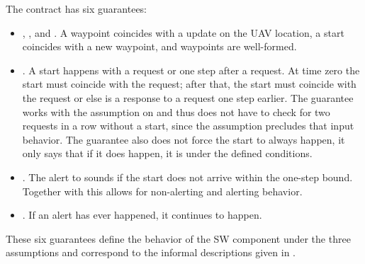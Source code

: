 \noindent The contract has six guarantees:
\begin{itemize}
\item {}, , and .
A waypoint coincides with a update on the UAV location, a start coincides with a new waypoint, and waypoints are well-formed.
\item {}. A start happens with a request or one step after a request. At time zero the start must coincide
with the request; after that, the start must coincide with the request
or else is a response to a request one step earlier.  The guarantee
works with the assumption on  and thus does
not have to check for two requests in a row without a start, since the
assumption precludes that input behavior. The guarantee also does not
force the start to always happen, it only says that if it does happen,
it is under the defined conditions.

\item {}. The alert to sounds if the start does not arrive within the one-step bound. Together with  this allows
for non-alerting and alerting behavior.
\item {}. If an alert has ever happened,
it continues to happen.
\end{itemize}
These six guarantees define the behavior of the SW component under the
three assumptions and correspond to the informal descriptions given
in .
